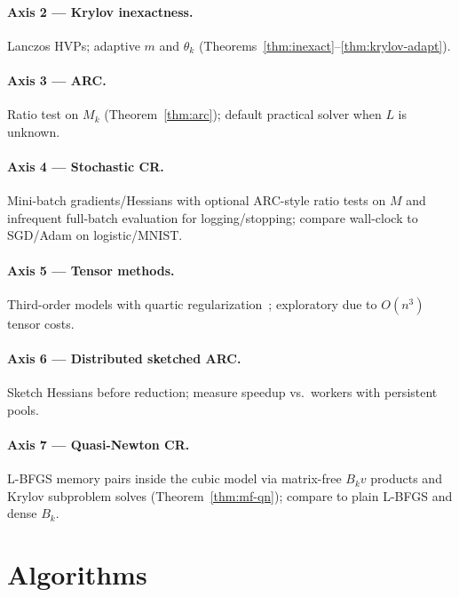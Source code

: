 \documentclass[11pt,a4paper]{article}
\begin{document}
\paragraph{Axis 2 --- Krylov inexactness.}
Lanczos HVPs; adaptive $m$ and $\theta_{k}$ (Theorems~\ref{thm:inexact}--\ref{thm:krylov-adapt}).

\paragraph{Axis 3 --- ARC.}
Ratio test on $M_{k}$ (Theorem~\ref{thm:arc}); default practical solver when $L$ is unknown.

\paragraph{Axis 4 --- Stochastic CR.}
Mini-batch gradients/Hessians with optional ARC-style ratio tests on $M$ and infrequent full-batch evaluation for logging/stopping; compare wall-clock to SGD/Adam on logistic/MNIST.

\paragraph{Axis 5 --- Tensor methods.}
Third-order models with quartic regularization~\cite{nesterov2021implementable}; exploratory due to $O(n^{3})$ tensor costs.

\paragraph{Axis 6 --- Distributed sketched ARC.}
Sketch Hessians before reduction; measure speedup vs.\ workers with persistent pools.

\paragraph{Axis 7 --- Quasi-Newton CR.}
L-BFGS memory pairs inside the cubic model via matrix-free $B_{k}v$ products and Krylov subproblem solves (Theorem~\ref{thm:mf-qn}); compare to plain L-BFGS and dense $B_{k}$.

\section{Algorithms}
\label{sec:algo}
\end{document}
